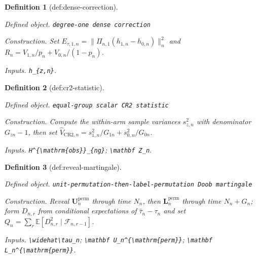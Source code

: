 \documentclass{article}
\newtheorem{definition}{Definition}
\begin{document}
\begin{definition}[def:dense-correction]\label{def:dense-correction}
\par\smallskip\noindent\emph{Defined object.} \texttt{degree-\allowbreak{}one dense correction}
\par\smallskip\noindent\emph{Construction.} Set \(E_{\tau,1,n}=\|\Pi_{n,1}(h_{1,n}-h_{0,n})\|_n^2\) and \(R_n=V_{1,n}/p_n+V_{0,n}/(1-p_n)\).
\par\smallskip\noindent\emph{Inputs.} \texttt{h\_\allowbreak{}\{z,\allowbreak{}n\}\allowbreak{}}.
\end{definition}

\begin{definition}[def:cr2-statistic]\label{def:cr2-statistic}
\par\smallskip\noindent\emph{Defined object.} \texttt{equal-\allowbreak{}group scalar CR2 statistic}
\par\smallskip\noindent\emph{Construction.} Compute the within-arm sample variances \(s_{z,n}^2\) with denominator \(G_{zn}-1\), then set \(\widehat V_{\mathrm{CR2},n}=s_{1,n}^2/G_{1n}+s_{0,n}^2/G_{0n}\).
\par\smallskip\noindent\emph{Inputs.} \texttt{H\textasciicircum{}\{\textbackslash{}\allowbreak{}mathrm\{obs\}\allowbreak{}\}\allowbreak{}\_\allowbreak{}\{ng\}\allowbreak{}}; \texttt{\textbackslash{}\allowbreak{}mathbf Z\_\allowbreak{}n}.
\end{definition}

\begin{definition}[def:reveal-martingale]\label{def:reveal-martingale}
\par\smallskip\noindent\emph{Defined object.} \texttt{unit-\allowbreak{}permutation-\allowbreak{}then-\allowbreak{}label-\allowbreak{}permutation Doob martingale}
\par\smallskip\noindent\emph{Construction.} Reveal \(\mathbf U_n^{\mathrm{perm}}\) through time \(N_n\), then \(\mathbf L_n^{\mathrm{perm}}\) through time \(N_n+G_n\); form \(D_{n,r}\) from conditional expectations of \(\widehat\tau_n-\tau_n\) and set \(Q_n=\sum_r\mathbb E[D_{n,r}^2\mid\mathcal F_{n,r-1}]\).
\par\smallskip\noindent\emph{Inputs.} \texttt{\textbackslash{}\allowbreak{}widehat\textbackslash{}\allowbreak{}tau\_\allowbreak{}n}; \texttt{\textbackslash{}\allowbreak{}mathbf U\_\allowbreak{}n\textasciicircum{}\{\textbackslash{}\allowbreak{}mathrm\{perm\}\allowbreak{}\}\allowbreak{}}; \texttt{\textbackslash{}\allowbreak{}mathbf L\_\allowbreak{}n\textasciicircum{}\{\textbackslash{}\allowbreak{}mathrm\{perm\}\allowbreak{}\}\allowbreak{}}.
\end{definition}
\end{document}
